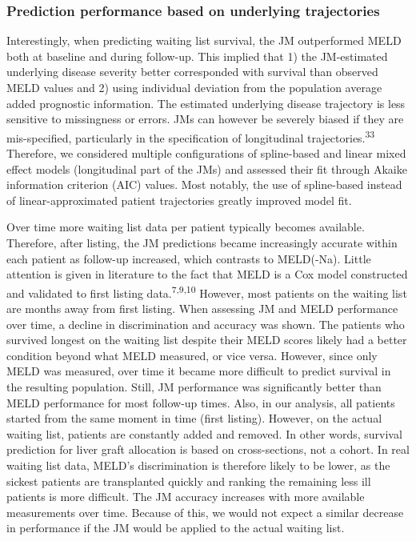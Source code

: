 \documentclass[11pt,english,]{book} %
\begin{document}
\hypertarget{prediction-performance-based-on-underlying-trajectories}{%
\subsubsection*{Prediction performance based on underlying trajectories}\label{prediction-performance-based-on-underlying-trajectories}}

Interestingly, when predicting waiting list survival, the JM outperformed MELD both at baseline and during follow-up. This implied that 1) the JM-estimated underlying disease severity better corresponded with survival than observed MELD values and 2) using individual deviation from the population average added prognostic information. The estimated underlying disease trajectory is less sensitive to missingness or errors. JMs can however be severely biased if they are mis-specified, particularly in the specification of longitudinal trajectories.\textsuperscript{33} Therefore, we considered multiple configurations of spline-based and linear mixed effect models (longitudinal part of the JMs) and assessed their fit through Akaike information criterion (AIC) values. Most notably, the use of spline-based instead of linear-approximated patient trajectories greatly improved model fit.

Over time more waiting list data per patient typically becomes available. Therefore, after listing, the JM predictions became increasingly accurate within each patient as follow-up increased, which contrasts to MELD(-Na). Little attention is given in literature to the fact that MELD is a Cox model constructed and validated to first listing data.\textsuperscript{7,9,10} However, most patients on the waiting list are months away from first listing. When assessing JM and MELD performance over time, a decline in discrimination and accuracy was shown. The patients who survived longest on the waiting list despite their MELD scores likely had a better condition beyond what MELD measured, or vice versa. However, since only MELD was measured, over time it became more difficult to predict survival in the resulting population. Still, JM performance was significantly better than MELD performance for most follow-up times. Also, in our analysis, all patients started from the same moment in time (first listing). However, on the actual waiting list, patients are constantly added and removed. In other words, survival prediction for liver graft allocation is based on cross-sections, not a cohort. In real waiting list data, MELD's discrimination is therefore likely to be lower, as the sickest patients are transplanted quickly and ranking the remaining less ill patients is more difficult. The JM accuracy increases with more available measurements over time. Because of this, we would not expect a similar decrease in performance if the JM would be applied to the actual waiting list.
\end{document}
